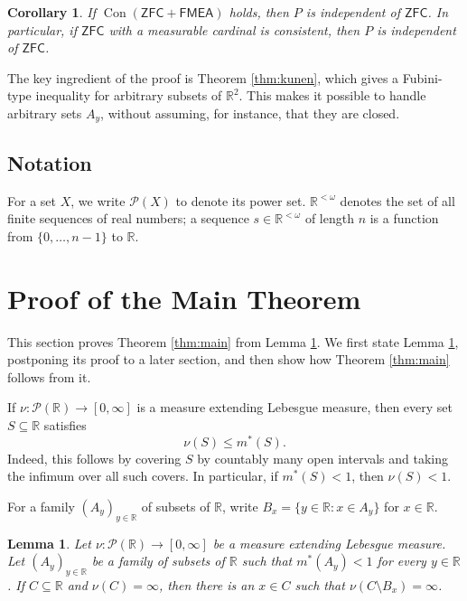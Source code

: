 \documentclass{amsart}
\theoremstyle{plain}
\newtheorem{lemma}[theorem]{Lemma}
\newtheorem{corollary}[theorem]{Corollary}
\theoremstyle{definition}
\newcommand{\R}{\mathbb{R}}
\newcommand{\Pc}{\mathcal{P}}
\newcommand{\ZFC}{\mathsf{ZFC}}
\newcommand{\FMEA}{\mathsf{FMEA}}
\newcommand{\Con}{\operatorname{Con}}
\begin{document}
\begin{corollary}\label{cor:relative-independence}
If $\Con(\ZFC+\FMEA)$ holds, then $P$ is independent of $\ZFC$.
In particular, if $\ZFC$ with a measurable cardinal is consistent, then $P$ is independent of $\ZFC$.
\end{corollary}

The key ingredient of the proof is Theorem \ref{thm:kunen}, which gives a Fubini-type inequality for arbitrary subsets of $\R^2$.
This makes it possible to handle arbitrary sets $A_y$, without assuming, for instance, that they are closed.

\subsection*{Notation}

For a set $X$, we write $\Pc(X)$ to denote its power set.
$\R^{<\omega}$ denotes the set of all finite sequences of real numbers; a sequence $s\in\R^{<\omega}$ of length $n$ is a function from $\{0,\ldots,n-1\}$ to $\R$.

\section{Proof of the Main Theorem}\label{sec:main-theorem-proof}

This section proves Theorem \ref{thm:main} from Lemma \ref{lem:key-selection}.
We first state Lemma \ref{lem:key-selection}, postponing its proof to a later section, and then show how Theorem \ref{thm:main} follows from it.

If $\nu:\Pc(\R)\to[0,\infty]$ is a measure extending Lebesgue measure, then every set $S\subseteq\R$ satisfies
\begin{equation}\label{eq:outer-measure-domination}
\nu(S)\le m^*(S).
\end{equation}
Indeed, this follows by covering $S$ by countably many open intervals and taking the infimum over all such covers.
In particular, if $m^*(S)<1$, then $\nu(S)<1$.

For a family $(A_y)_{y\in\R}$ of subsets of $\R$, write $B_x=\{y\in\R:x\in A_y\}$ for $x\in\R$.

\begin{lemma}\label{lem:key-selection}
Let $\nu:\Pc(\R)\to[0,\infty]$ be a measure extending Lebesgue measure.
Let $(A_y)_{y\in\R}$ be a family of subsets of $\R$ such that $m^*(A_y)<1$ for every $y\in\R$.
If $C\subseteq\R$ and $\nu(C)=\infty$, then there is an $x\in C$ such that $\nu(C\setminus B_x)=\infty$.
\end{lemma}
\end{document}
